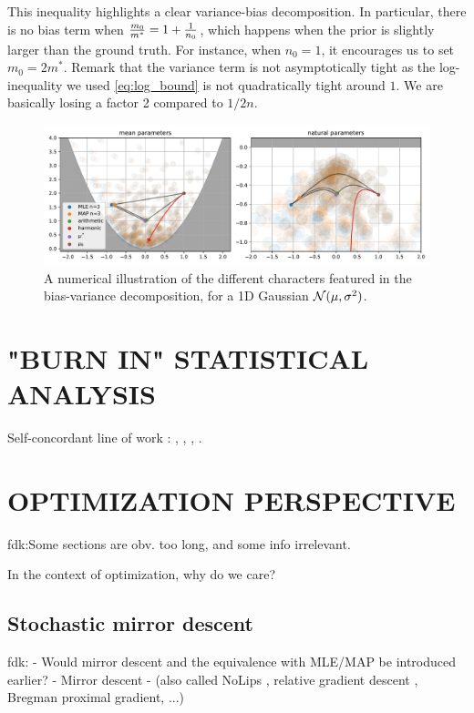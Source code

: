 \documentclass[twoside]{article}
\let\oldsection\section
\renewcommand{\section}[1]{\oldsection{\texorpdfstring{\uppercase{#1}}{#1}}}
\newcommand{\fdk}[1]{\textcolor{Periwinkle}{fdk:#1}}
\newcommand{\m}{m}
\begin{document}
This inequality highlights a clear variance-bias decomposition.
In particular, there is no bias term when $\frac{\m_0}{\m^*} =1 + \inv{n_0} $, which happens when the prior is slightly larger than the ground truth.  For instance, when $n_0=1$, it encourages us to set $\m_0 = 2 \m^*$.
Remark that the variance term is not asymptotically tight as the log-inequality we used \eqref{eq:log_bound} is not quadratically tight around $1$. We are basically losing a factor 2 compared to $1/2n$.


\begin{figure}[t]
	\centering
	\includegraphics[width=\textwidth]{figs/thales/numerical_schema_n=3.pdf}
	\caption{A numerical illustration of the different characters featured in the bias-variance decomposition, for a 1D Gaussian ${\mathcal N}(\mu, \sigma^2)$.}
	\label{fig:bias-variance-numerical}
\end{figure}

\section{"Burn In" Statistical Analysis}
Self-concordant line of work : 
\citet{bubeck2015entropic}
\citet{kakade2010learning},
\citet{anastasiou2017bounds},
\citet{marteauferey2019beyond},
\citet{ostrovskii2021finite}.



\section{Optimization Perspective}
\fdk{Some sections are obv. too long, and some info irrelevant.}

In the context of optimization, why do we care? 

\subsection{Stochastic mirror descent}

\fdk{
- Would mirror descent and the equivalence with MLE/MAP be introduced earlier?
- Mirror descent \citep{nemirovski1983problem,beck2003mirror}
- (also called NoLips \citep{bauschke2017descent}, 
relative gradient descent \citep{hanzely2018fastest},
Bregman proximal gradient, ...)
}
\end{document}
